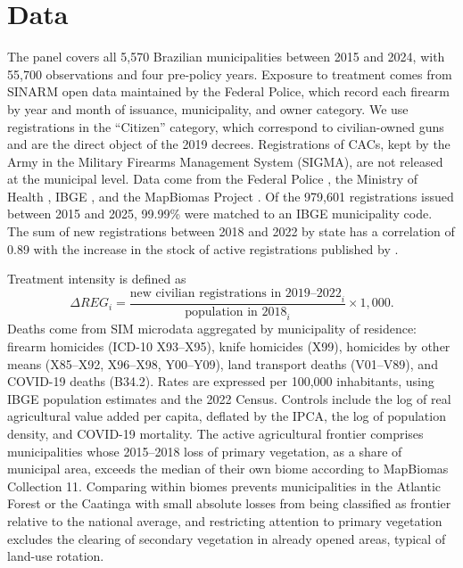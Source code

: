 \documentclass[11pt,a4paper]{article}
\begin{document}
\section{Data}\label{sec:dados}

The panel covers all 5,570 Brazilian municipalities between 2015 and 2024, with 55,700 observations and four pre-policy years. Exposure to treatment comes from SINARM open data maintained by the Federal Police, which record each firearm by year and month of issuance, municipality, and owner category. We use registrations in the ``Citizen'' category, which correspond to civilian-owned guns and are the direct object of the 2019 decrees. Registrations of CACs, kept by the Army in the Military Firearms Management System (SIGMA), are not released at the municipal level. Data come from the Federal Police \citep{sinarm}, the Ministry of Health \citep{sim}, IBGE \citep{ibge}, and the MapBiomas Project \citep{mapbiomas}. Of the 979,601 registrations issued between 2015 and 2025, 99.99\% were matched to an IBGE municipality code. The sum of new registrations between 2018 and 2022 by state has a correlation of 0.89 with the increase in the stock of active registrations published by \citet{fbsp2023}.

Treatment intensity is defined as
\begin{equation}
\Delta REG_i = \frac{\text{new civilian registrations in 2019--2022}_i}{\text{population in 2018}_i}\times 1{,}000.
\end{equation}
Deaths come from SIM microdata aggregated by municipality of residence: firearm homicides (ICD-10 X93--X95), knife homicides (X99), homicides by other means (X85--X92, X96--X98, Y00--Y09), land transport deaths (V01--V89), and COVID-19 deaths (B34.2). Rates are expressed per 100,000 inhabitants, using IBGE population estimates and the 2022 Census. Controls include the log of real agricultural value added per capita, deflated by the IPCA, the log of population density, and COVID-19 mortality. The active agricultural frontier comprises municipalities whose 2015--2018 loss of primary vegetation, as a share of municipal area, exceeds the median of their own biome according to MapBiomas Collection 11. Comparing within biomes prevents municipalities in the Atlantic Forest or the Caatinga with small absolute losses from being classified as frontier relative to the national average, and restricting attention to primary vegetation excludes the clearing of secondary vegetation in already opened areas, typical of land-use rotation.
\end{document}
